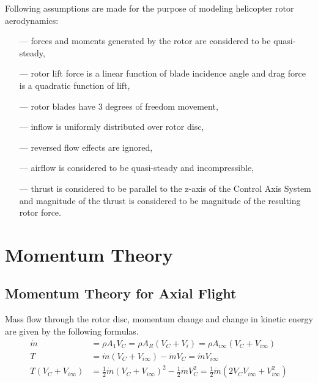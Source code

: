 Following assumptions are made for the purpose of modeling helicopter rotor aerodynamics:
\begin{itemize}
  \item[---] forces and moments generated by the rotor are considered to be quasi-steady,
  \item[---] rotor lift force is a linear function of blade incidence angle and drag force is a quadratic function of lift, \cite{Padfield2007}
  \item[---] rotor blades have 3 degrees of freedom movement,
  \item[---] inflow is uniformly distributed over rotor disc, \cite{Padfield2007}
  \item[---] reversed flow effects are ignored,
  \item[---] airflow is considered to be quasi-steady and incompressible,
  \item[---] thrust is considered to be parallel to the z-axis of the Control Axis System and magnitude of the thrust is considered to be magnitude of the resulting rotor force. \cite{GessowMyers1985}
\end{itemize}


\section{Momentum Theory}

\subsection{Momentum Theory for Axial Flight}

Mass flow through the rotor disc, momentum change and change in kinetic energy are given by the following formulas. \cite{Padfield2007}
\begin{align}
  \label{eq-aero-mass-flow}
  \dot m
  &=
  \rho A_1 V_C = \rho A_R \left( V_C + V_i \right)
  =
  \rho A_{i \infty} \left( V_C + V_{i \infty}  \right) \\
  \label{eq-aero-thrust-1}
  T
  &=
  \dot m \left( V_C + V_{i \infty} \right)
  -
  \dot m V_C = \dot m V_{ i \infty } \\
  T \left( V_C + V_{ i \infty } \right)
  &=
  \frac{1}{2} \dot m \left( V_C + V_{ i \infty } \right)^2
  -
  \frac{1}{2} \dot m V_C^2
  =
  \frac{1}{2} \dot m \left( 2V_C V_{ i \infty } + V_{ i \infty }^2 \right)
\end{align}

